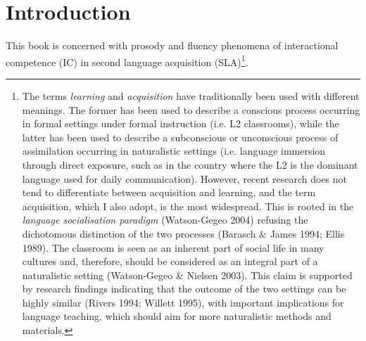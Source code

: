 \setcounter{tocdepth}{5}
\renewcommand\contentsname{Contents}
\tableofcontents
\clearpage\section{Introduction}
\hypertarget{Toc191305872}{}\begin{styleStandard}
This book is concerned with prosody and fluency phenomena of interactional competence (IC) in second language acquisition (SLA)\footnote{The terms \textit{learning} and \textit{acquisition} have traditionally been used with different meanings. The former has been used to describe a conscious process occurring in formal settings under formal instruction (i.e. L2 classrooms), while the latter has been used to describe a subconscious or unconscious process of assimilation occurring in naturalistic settings (i.e. language immersion through direct exposure, such as in the country where the L2 is the dominant language used for daily communication). However, recent research does not tend to differentiate between acquisition and learning, and the term acquisition, which I also adopt, is the most widespread. This is rooted in the \textit{language socialisation paradigm }(Watson-Gegeo 2004) refusing the dichotomous distinction of the two processes (Barasch \& James 1994; Ellis 1989). The classroom is seen as an inherent part of social life in many cultures and, therefore, should be considered as an integral part of a naturalistic setting (Watson-Gegeo \& Nielsen 2003). This claim is supported by research findings indicating that the outcome of the two settings can be highly similar (Rivers 1994; Willett 1995), with important implications for language teaching, which should aim for more naturalistic methods and materials.}. 
\end{styleStandard}


